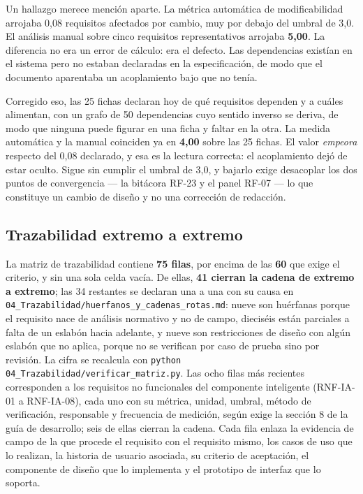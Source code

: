\documentclass[11pt,a4paper]{article}
\begin{document}
Un hallazgo merece menci\'on aparte. La m\'etrica autom\'atica de modificabilidad
arrojaba 0,08 requisitos afectados por cambio, muy por debajo del umbral de 3,0. El
an\'alisis manual sobre cinco requisitos representativos arrojaba \textbf{5,00}. La
diferencia no era un error de c\'alculo: era el defecto. Las dependencias exist\'ian en el
sistema pero no estaban declaradas en la especificaci\'on, de modo que el documento
aparentaba un acoplamiento bajo que no ten\'ia.

Corregido eso, las 25 fichas declaran hoy de qu\'e requisitos dependen y a cu\'ales
alimentan, con un grafo de 50 dependencias cuyo sentido inverso se deriva, de modo que
ninguna puede figurar en una ficha y faltar en la otra. La medida autom\'atica y la manual
coinciden ya en \textbf{4,00} sobre las 25 fichas. El valor \emph{empeora} respecto del
0,08 declarado, y esa es la lectura correcta: el acoplamiento dej\'o de estar oculto. Sigue
sin cumplir el umbral de 3,0, y bajarlo exige desacoplar los dos puntos de convergencia
--- la bit\'acora RF-23 y el panel RF-07 --- lo que constituye un cambio de dise\~no y no
una correcci\'on de redacci\'on.

\subsection{Trazabilidad extremo a extremo}

La matriz de trazabilidad contiene \textbf{75 filas}, por encima de las
\textbf{60} que exige el criterio, y sin una sola celda vac\'ia. De ellas,
\textbf{41 cierran la cadena de extremo a extremo}; las 34 restantes se declaran una
a una con su causa en \texttt{04\_Trazabilidad/huerfanos\_y\_cadenas\_rotas.md}:
nueve son hu\'erfanas porque el requisito nace de an\'alisis normativo y no de campo,
diecis\'eis est\'an parciales a falta de un eslab\'on hacia adelante, y nueve son
restricciones de dise\~no con alg\'un eslab\'on que no aplica, porque no se verifican por
caso de prueba sino por revisi\'on. La cifra se recalcula con
\texttt{python 04\_Trazabilidad/verificar\_matriz.py}.
Las ocho filas m\'as recientes corresponden a los requisitos no funcionales del
componente inteligente (RNF-IA-01 a RNF-IA-08), cada uno con su m\'etrica, unidad,
umbral, m\'etodo de verificaci\'on, responsable y frecuencia de medici\'on, seg\'un
exige la secci\'on 8 de la gu\'ia de desarrollo; seis de ellas cierran la cadena. Cada fila enlaza la evidencia de campo de la que procede el requisito
con el requisito mismo, los casos de uso que lo realizan, la historia de usuario
asociada, su criterio de aceptaci\'on, el componente de dise\~no que lo implementa y
el prototipo de interfaz que lo soporta.
\end{document}
